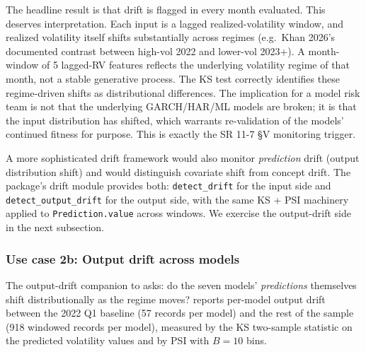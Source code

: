 The headline result is that drift is flagged in every month evaluated. This deserves interpretation. Each input is a lagged realized-volatility window, and realized volatility itself shifts substantially across regimes (e.g.\ Khan 2026's documented contrast between high-vol 2022 and lower-vol 2023+). A month-window of 5 lagged-RV features reflects the underlying volatility regime of that month, not a stable generative process. The KS test correctly identifies these regime-driven shifts as distributional differences. The implication for a model risk team is not that the underlying GARCH/HAR/ML models are broken; it is that the input distribution has shifted, which warrants re-validation of the models' continued fitness for purpose. This is exactly the SR 11-7 §V monitoring trigger.

A more sophisticated drift framework would also monitor \emph{prediction} drift (output distribution shift) and would distinguish covariate shift from concept drift. The package's drift module provides both: \texttt{detect\_drift} for the input side and \texttt{detect\_output\_drift} for the output side, with the same KS + PSI machinery applied to \texttt{Prediction.value} across windows. We exercise the output-drift side in the next subsection.

\subsubsection{Use case 2b: Output drift across models}\label{sec:demonstration_output_drift}

The output-drift companion to  asks: do the seven models' \emph{predictions} themselves shift distributionally as the regime moves?  reports per-model output drift between the 2022 Q1 baseline (57 records per model) and the rest of the sample (918 windowed records per model), measured by the KS two-sample statistic on the predicted volatility values and by PSI with $B=10$ bins.


